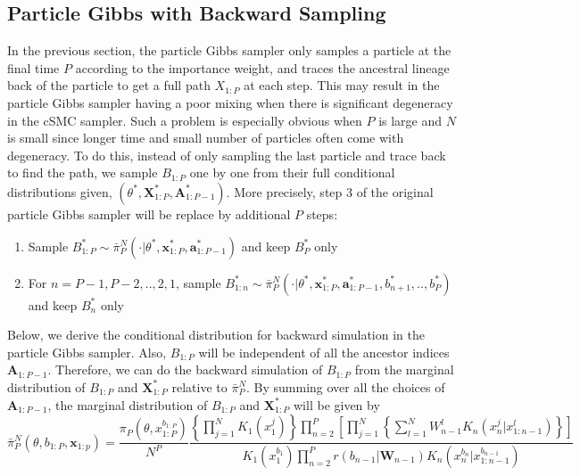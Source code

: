 \documentclass[12pt,a4paper]{article}
\begin{document}
\subsection{Particle Gibbs with Backward Sampling}
In the previous section, the particle Gibbs sampler only samples a particle at the final time $P$ according to the importance weight, and traces the ancestral lineage back of the particle to get a full path $X_{1:P}$ at each step. This may result in the particle Gibbs sampler having a poor mixing when there is significant degeneracy in the cSMC sampler. Such a problem is especially obvious when $P$ is large and $N$ is small since longer time and small number of particles often come with degeneracy. To do this, instead of only sampling the last particle and trace back to find the path, we sample $B_{1:P}$ one by one from their full conditional distributions given, $\left(\theta^{*},\textbf{X}_{1:P}^{*},\textbf{A}_{1:P-1}^{*}\right)$. More precisely, step 3 of the original particle Gibbs sampler will be replace by additional $P$ steps:
\begin{enumerate}
    \item Sample $B_{1:P}^{*} \sim \bar{\pi}_P^N \left(\cdot | \theta^{*}, \textbf{x}_{1:P}^{*},\textbf{a}_{1:P-1}^{*}\right)$ and keep $B_P^{*}$ only
    \item For $n=P-1,P-2,..,2,1$, sample $B_{1:n}^{*} \sim \bar{\pi}_P^N\left(\cdot|\theta^{*},\textbf{x}_{1:P}^{*},\textbf{a}_{1:P-1}^{*},b_{n+1}^{*},..,b_P^{*}\right)$ and keep $B_n^{*}$ only 
\end{enumerate}
Below, we derive the conditional distribution for backward simulation in the particle Gibbs sampler. Also, $B_{1:P}$ will be independent of all the ancestor indices $\textbf{A}_{1:P-1}$. Therefore, we can do the backward simulation of $B_{1:P}$ from the marginal distribution of $B_{1:P}$ and $\textbf{X}_{1:P}^{*}$ relative to $\bar{\pi}_P^N$. By summing over all the choices of $\textbf{A}_{1:P-1}$, the marginal distribution of $B_{1:P}$ and $\textbf{X}_{1:P}^{*}$ will be given by 
\begin{equation}
    \label{Eqn:Marginal of Pi_Bar}
    \bar{\pi}_P^N \left(\theta,b_{1:P},\textbf{x}_{1:p}\right) = \frac{\pi_P\left(\theta,x_{1:P}^{b_{1:P}}\right)}{N^P} \frac{\left\{\prod_{j=1}^N K_1(x_1^j)\right\}\prod_{n=2}^P \left[\prod_{j=1}^N \left\{\sum_{l=1}^N W_{n-1}^l K_n (x_n^j|x_{1:n-1}^l)\right\}\right]}{K_1\left(x_1^{b_1}\right)\prod_{n=2}^P r(b_{n-1}|\textbf{W}_{n-1}) K_n(x_n^{b_n}|x_{1:n-1}^{b_{n-1}})}
\end{equation}
\end{document}
